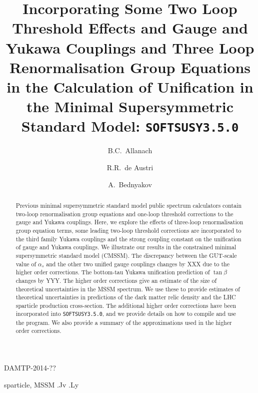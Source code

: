 \documentclass[final,3p,times,pdflatex]{elsarticle}
\begin{document}
\begin{frontmatter}

\begin{flushright}
DAMTP-2014-??
\end{flushright}

\title{Incorporating Some Two Loop Threshold Effects and Gauge and
  Yukawa Couplings and Three Loop
  Renormalisation Group Equations in the Calculation of Unification in
  the Minimal Supersymmetric Standard Model: {\tt SOFTSUSY3.5.0}}

\author[damtp]{B.C.~Allanach}
\author[valencia]{R.R.~de Austri}
\author[dunba]{A.~Bednyakov}

\address[damtp]{DAMTP, CMS, University of Cambridge, Wilberforce road,
  Cambridge, CB3  0WA, United Kingdom}
\address[valencia]{Instituto de Física Corpuscular | Parque Científico,
  C/Catedrático José Beltrán, 2 | E-46980 Paterna, Spain} 
\address[dubna]{Joint Institute for Nuclear Research, 141980, Dubna, Russia}

\begin{abstract}
  Previous minimal supersymmetric standard model public spectrum calculators
  contain two-loop 
  renormalisation group equations and one-loop threshold corrections to the
  gauge and Yukawa couplings. Here, we explore the effects of three-loop
  renormalisation group equation terms, some leading two-loop threshold
  corrections are incorporated to the third family Yukawa couplings and the
  strong coupling constant on the unification of gauge and Yukawa couplings.
  We illustrate our results in the constrained minimal supersymmetric standard
  model (CMSSM). The discrepancy between the GUT-scale value of $\alpha_s$ and
  the other two unified gauge couplings changes by XXX due to the higher order
  corrections. The bottom-tau Yukawa unification prediction of $\tan \beta$
  changes by YYY. The higher order corrections give an estimate of the size of
  theoretical uncertainties in the MSSM spectrum. We use these to provide
  estimates 
  of theoretical uncertainties in predictions of the dark matter relic density
  and the LHC sparticle production cross-section.
  The additional higher order corrections have been
  incorporated into {\tt SOFTSUSY3.5.0}, and we provide details on how to
  compile and use the program. We also provide a summary of the
  approximations used in the higher order corrections. 
\end{abstract}

\begin{keyword}
sparticle, 
MSSM
.Jv
.Ly
\end{keyword}
\end{frontmatter}
\end{document}
